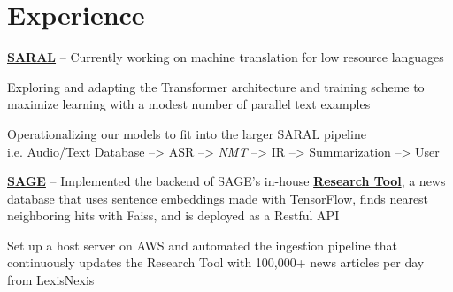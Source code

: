 \documentclass[letterpaper]{deedy-resume} %
\begin{document}
\begin{minipage}[t]{0.33\textwidth}
\sectionspace %


\end{minipage} %
\hfill
%
%
\begin{minipage}[t]{0.66\textwidth} %


\section{Experience}

\vspace{\topsep} %
\begin{tightitemize}
\item \href{https://viterbischool.usc.edu/news/2018/01/usc-isi-develop-translation-information-retrieval-system-uncommon-languages/}{\bf SARAL} -- Currently working on machine translation for low resource languages 
\item Exploring and adapting the Transformer architecture and training scheme to maximize learning with a modest number of parallel text examples
\item Operationalizing our models to fit into the larger SARAL pipeline \\
i.e. Audio/Text Database --> ASR --> {\it NMT} --> IR --> Summarization --> User
\item \href{https://sage-platform.isi.edu}{\bf SAGE} -- Implemented the backend of SAGE's in-house \href{http://54.153.12.18/research-tool/?referrer=rct&id=UXVlc3Rpb25Ob2RlOjMxMA==&token=eyJ0eXAiOiJKV1QiLCJhbGciOiJIUzI1NiJ9.eyJ1c2VyX2lkIjoxODExLCJ1c2VybmFtZSI6ImFkbWluIiwiZXhwIjoxNTYxODE3NTMzLCJlbWFpbCI6InNhZ2VAaXNpLmVkdSJ9.bFMd1C0R938hAJic-gzNEXTfI1bpZZW_VusjpXAommg}{\bf Research Tool}, a news database that uses sentence embeddings made with TensorFlow, finds nearest neighboring hits with Faiss, and is deployed as a Restful API
\item Set up a host server on AWS and automated the ingestion pipeline that continuously updates the Research Tool with 100,000+ news articles per day from LexisNexis 
\end{tightitemize}



\end{minipage}
\end{document}
